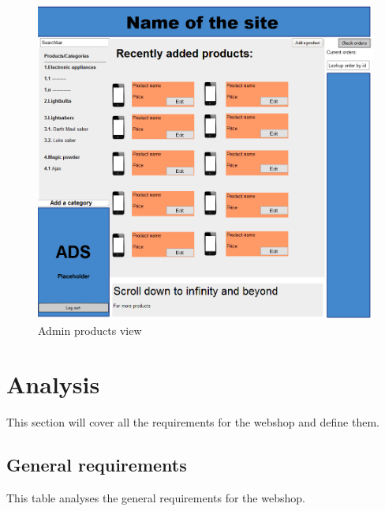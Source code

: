 \documentclass[a4paper,12pt]{article}
\begin{document}
\begin{figure}[htbp]
	\caption{Admin products view}
	\includegraphics[width=\textwidth,height=\textheight,keepaspectratio]{img/Products_admin.png}
\end{figure}
\newpage
\section{Analysis}
This section will cover all the requirements for the webshop and define them.
\subsection{General requirements }
This table analyses the general requirements for the webshop.
\newline
\end{document}
